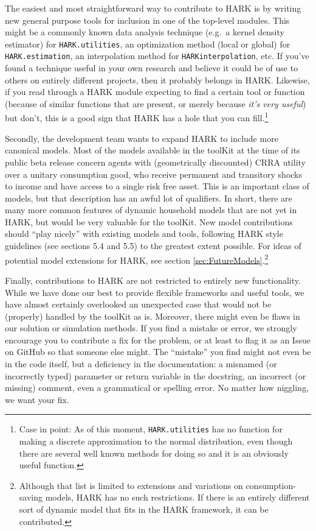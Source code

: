 \documentclass[12pt,titlepage,letterpaper]{econtex}
\begin{document}
The easiest and most straightforward way to contribute to HARK is by writing new general purpose tools for inclusion in one of the top-level modules.  This might be a commonly known data analysis technique (e.g.\ a kernel density estimator) for \texttt{HARK.utilities}, an optimization method (local or global) for \texttt{HARK.estimation}, an interpolation method for \texttt{HARKinterpolation}, etc.  If you've found a technique useful in your own research and believe it could be of use to others on entirely different projects, then it probably belongs in HARK.  Likewise, if you read through a HARK module expecting to find a certain tool or function (because of similar functions that are present, or merely because \textit{it's very useful}) but don't, this is a good sign that HARK has a hole that you can fill.\footnote{Case in point: As of this moment, \texttt{HARK.utilities} has no function for making a discrete approximation to the normal distribution, even though there are several well known methods for doing so and it is an obviously useful function.}

Secondly, the development team wants to expand HARK to include more canonical models.  Most of the models available in the toolKit at the time of its public beta release concern agents with (geometrically discounted) CRRA utility over a unitary consumption good, who receive permanent and transitory shocks to income and have access to a single risk free asset.  This is an important class of models, but that description has an awful lot of qualifiers.  In short, there are many more common features of dynamic household models that are not yet in HARK, but would be very valuable for the toolKit.  New model contributions should ``play nicely'' with existing models and tools, following HARK style guidelines (see sections 5.4 and 5.5) to the greatest extent possible.  For ideas of potential model extensions for HARK, see section \ref{sec:FutureModels}.\footnote{Although that list is limited to extensions and variations on consumption-saving models, HARK has no such restrictions.  If there is an entirely different sort of dynamic model that fits in the HARK framework, it can be contributed.}

Finally, contributions to HARK are not restricted to entirely new functionality.  While we have done our best to provide flexible frameworks and useful tools, we have almost certainly overlooked an unexpected case that would not be (properly) handled by the toolKit as is.  Moreover, there might even be flaws in our solution or simulation methods.  If you find a mistake or error, we strongly encourage you to contribute a fix for the problem, or at least to flag it as an Issue on GitHub so that someone else might.  The ``mistake'' you find might not even be in the code itself, but a deficiency in the documentation: a misnamed (or incorrectly typed) parameter or return variable in the docstring, an incorrect (or missing) comment, even a grammatical or spelling error. No matter how niggling, we want your fix.
\end{document}
